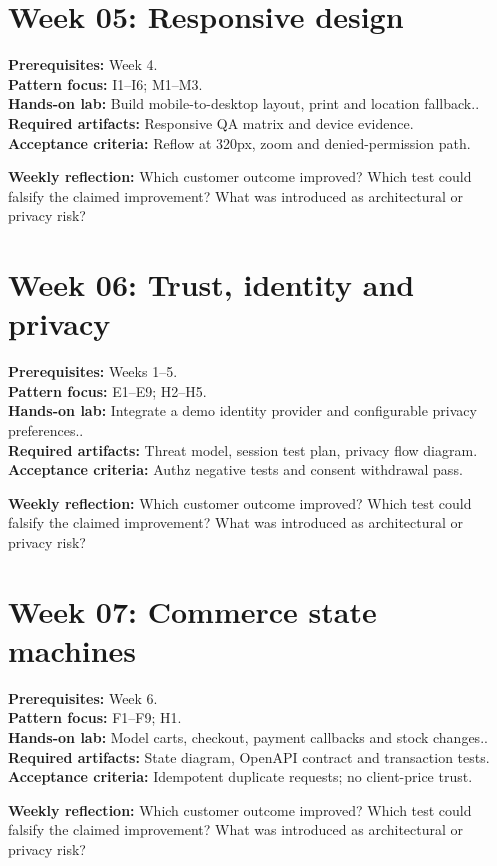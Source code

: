 \documentclass[11pt]{article}
\begin{document}
\section{Week 05: Responsive design}
\textbf{Prerequisites:} Week 4.\\
\textbf{Pattern focus:} I1--I6; M1--M3.\\
\textbf{Hands-on lab:} Build mobile-to-desktop layout, print and location fallback..\\
\textbf{Required artifacts:} Responsive QA matrix and device evidence.\\
\textbf{Acceptance criteria:} Reflow at 320px, zoom and denied-permission path.
\begin{decisionbox}\textbf{Weekly reflection:} Which customer outcome improved? Which test could falsify the claimed improvement? What was introduced as architectural or privacy risk?\end{decisionbox}
\section{Week 06: Trust, identity and privacy}
\textbf{Prerequisites:} Weeks 1--5.\\
\textbf{Pattern focus:} E1--E9; H2--H5.\\
\textbf{Hands-on lab:} Integrate a demo identity provider and configurable privacy preferences..\\
\textbf{Required artifacts:} Threat model, session test plan, privacy flow diagram.\\
\textbf{Acceptance criteria:} Authz negative tests and consent withdrawal pass.
\begin{decisionbox}\textbf{Weekly reflection:} Which customer outcome improved? Which test could falsify the claimed improvement? What was introduced as architectural or privacy risk?\end{decisionbox}
\section{Week 07: Commerce state machines}
\textbf{Prerequisites:} Week 6.\\
\textbf{Pattern focus:} F1--F9; H1.\\
\textbf{Hands-on lab:} Model carts, checkout, payment callbacks and stock changes..\\
\textbf{Required artifacts:} State diagram, OpenAPI contract and transaction tests.\\
\textbf{Acceptance criteria:} Idempotent duplicate requests; no client-price trust.
\begin{decisionbox}\textbf{Weekly reflection:} Which customer outcome improved? Which test could falsify the claimed improvement? What was introduced as architectural or privacy risk?\end{decisionbox}
\end{document}
